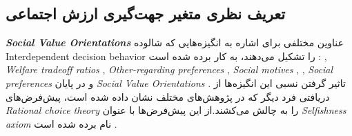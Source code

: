 







\subsection{تعریف نظری متغیر جهت‌گیری ارزش اجتماعی}
\textit{
    \textbf{
        \gls{Social Value Orientations}
    }
}
عناوین مختلفی برای اشاره به انگیزه‌هایی که شالوده
\gls{Interdependent decision behavior}
را تشکیل می‌دهند، به کار برده شده است
\!:
\!,
\textit{
    \gls{Welfare tradeoff ratios}
}
\!,
\textit{
    \gls{Other-regarding preferences}
}
\!,
\textit{
    \gls{Social motives}
}
\!,
\!,
\textit{
    \gls{Social preferences}
}
و در پایان
\textit{
    \gls{Social Value Orientations}
}
\!\citep{murphyMeasuringSocialValue2011}.
تاثیر گرفتن نسبی این انگیزه‌ها از دریافتی فرد دیگر که
در پژوهش‌های مختلف نشان داده شده است، پیش‌فرض‌های
\textit{
    \gls{Rational choice theory}
}
را به چالش می‌کشند.از این پیش‌فرض‌ها با عنوان
\textit{
    \gls{Selfishness axiom}
}
نام برده شده است
\!\citep{henrichEconomicManCrosscultural2005}.

